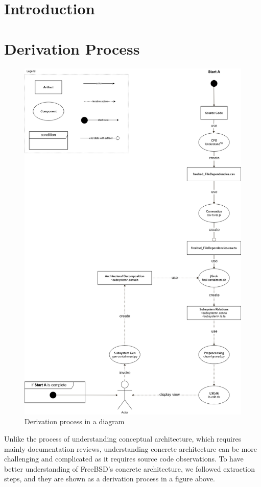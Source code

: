\documentclass[12pt, dvipsnames, a4paper]{article}
\begin{document}
\section{Introduction}
\lipsum[1]

\section{Derivation Process}
\begin{figure}[!htb]
	\center
	\includegraphics[width = 390pt]{assets/derivation_diagram.png}
	\caption{Derivation process in a diagram}
\end{figure}
Unlike the process of understanding conceptual architecture, which requires mainly documentation reviews, understanding concrete architecture can be more challenging and complicated as it requires source code observations. To have better understanding of FreeBSD’s concrete architecture, we followed extraction steps, and they are shown as a derivation process in a figure above.
\end{document}

